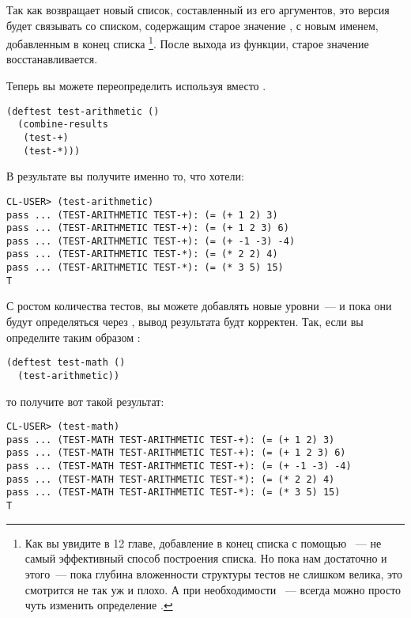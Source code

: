 Так как  возвращает новый список, составленный из его аргументов, это версия
будет связывать  со списком, содержащим старое значение
, с новым именем, добавленным в конец списка \footnote{Как вы увидите в
  12 главе, добавление в конец списка с помощью ~--- не самый эффективный
  способ построения списка. Но пока нам достаточно и этого~--- пока глубина вложенности
  структуры тестов не слишком велика, это смотрится не так уж и плохо. А при необходимости
 ~--- всегда можно просто чуть изменить определение .}. После выхода из
функции, старое значение  восстанавливается.

Теперь вы можете переопределить  используя  вместо
.

\begin{lstlisting}
(deftest test-arithmetic ()
  (combine-results
   (test-+)
   (test-*)))
\end{lstlisting}

В результате вы получите именно то, что хотели:

\begin{lstlisting}
CL-USER> (test-arithmetic)
pass ... (TEST-ARITHMETIC TEST-+): (= (+ 1 2) 3)
pass ... (TEST-ARITHMETIC TEST-+): (= (+ 1 2 3) 6)
pass ... (TEST-ARITHMETIC TEST-+): (= (+ -1 -3) -4)
pass ... (TEST-ARITHMETIC TEST-*): (= (* 2 2) 4)
pass ... (TEST-ARITHMETIC TEST-*): (= (* 3 5) 15)
T
\end{lstlisting}

С ростом количества тестов, вы можете добавлять новые уровни~--- и пока они будут
определяться через , вывод результата будт корректен. Так, если вы
определите таким образом :

\begin{lstlisting}
(deftest test-math ()
  (test-arithmetic))
\end{lstlisting}

то получите вот такой результат:

\begin{lstlisting}
CL-USER> (test-math)
pass ... (TEST-MATH TEST-ARITHMETIC TEST-+): (= (+ 1 2) 3)
pass ... (TEST-MATH TEST-ARITHMETIC TEST-+): (= (+ 1 2 3) 6)
pass ... (TEST-MATH TEST-ARITHMETIC TEST-+): (= (+ -1 -3) -4)
pass ... (TEST-MATH TEST-ARITHMETIC TEST-*): (= (* 2 2) 4)
pass ... (TEST-MATH TEST-ARITHMETIC TEST-*): (= (* 3 5) 15)
T
\end{lstlisting}

